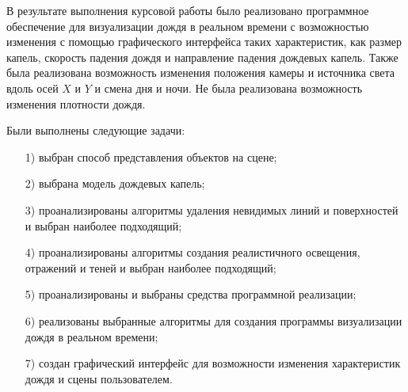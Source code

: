 В результате выполнения курсовой работы было реализовано программное обеспечение для визуализации дождя в реальном времени с возможностью изменения с помощью графического интерфейса таких характеристик, как размер капель, скорость падения дождя и направление падения дождевых капель. 
Также была реализована возможность изменения положения камеры и источника света вдоль осей $X$ и $Y$ и смена дня и ночи. 
Не была реализована возможность изменения плотности дождя.

Были выполнены следующие задачи:
\begin{enumerate}
\item[1)]
выбран способ представления объектов на сцене;
\item[2)]
выбрана модель дождевых капель;
\item[3)]
проанализированы алгоритмы удаления невидимых линий и поверхностей и выбран наиболее подходящий;
\item[4)]
проанализированы алгоритмы создания реалистичного освещения, отражений и теней и выбран наиболее подходящий;
\item[5)]
проанализированы и выбраны средства программной реализации;
\item[6)]
реализованы выбранные алгоритмы для создания программы визуализации дождя в реальном времени;
\item[7)]
создан графический интерфейс для возможности изменения характеристик дождя и сцены пользователем.
\end{enumerate}

{\center\printbibliography[title=Список использованных источников]}


